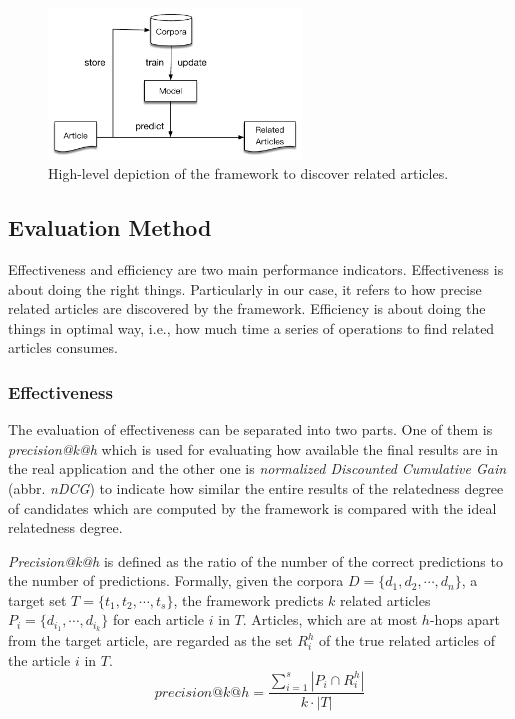 \begin{figure}[!htb]
    \centering
    \includegraphics[width=0.6\textwidth]{fig/high-level.pdf}
    \caption{High-level depiction of the framework to discover related articles. }
    \label{fig:highlevel}
\end{figure}

\subsection{Evaluation Method}
\label{sec:3.3}

Effectiveness and efficiency are two main performance indicators. Effectiveness is about doing the right things. Particularly in our case, it refers to how precise related articles are discovered by the framework. Efficiency is about doing the things in optimal way, i.e., how much time a series of operations to find related articles consumes. 

\subsubsection{Effectiveness}

The evaluation of effectiveness can be separated into two parts. One of them is \textit{precision@k@h} which is used for evaluating how available the final results are in the real application and the other one is \textit{normalized Discounted Cumulative Gain} (abbr. \textit{nDCG})  to indicate how similar the entire results of the relatedness degree of candidates which are computed by the framework is compared with the ideal relatedness degree.

\textit{Precision@k@h} is defined as the ratio of the number of the correct predictions to the number of predictions. Formally, given the corpora $D = \{d_1, d_2, \cdots, d_n\}$, a target set $T = \{t_1, t_2, \cdots, t_s\}$, the framework predicts $k$ related articles $P_i = \{d_{i_1}, \cdots, d_{i_k}\}$ for each article $i$ in $T$. Articles, which are at most $h$-hops apart from the target article, are regarded as the set $R_i^h$ of the true related articles of the article $i$ in $T$. 
\begin{equation}
    precision@k@h = \frac{\sum_{i=1}^s{|P_i \cap R_i^h|}}{k \cdot |T|}
\end{equation}

